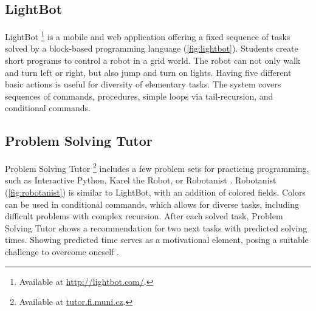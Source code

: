 \subsection{LightBot}
\label{sec:lightbot}
LightBot%
\footnote{Available at \url{http://lightbot.com/}.}
is a mobile and web application offering a fixed sequence of tasks solved by
a block-based programming language
(\cref{fig:lightbot}).
Students create short programs to control a robot in a grid world.
The robot can not only walk and turn left or right, but also jump and turn on lights.
Having five different basic actions is useful for diversity of elementary tasks.
The system covers sequences of commands, procedures, simple loops via tail-recursion,
and conditional commands.

%


\subsection{Problem Solving Tutor}
\label{sec:problem-solving-tutor}
Problem Solving Tutor%
\footnote{Available at \url{tutor.fi.muni.cz}.}
includes a few problem sets for practicing programming,
such as Interactive Python, Karel the Robot, or Robotanist
\cite{proso}.
Robotanist (\cref{fig:robotanist}) is similar to LightBot,
with an addition of colored fields.
Colors can be used in conditional commands, which allows for diverse tasks,
including difficult problems with complex recursion.  After
each solved task, Problem Solving Tutor shows a recommendation for two next
tasks %
with predicted solving times.
Showing predicted time %
serves as a motivational element, posing
a suitable challenge to overcome oneself
\cite{pelanek-student-modeling-times}.

